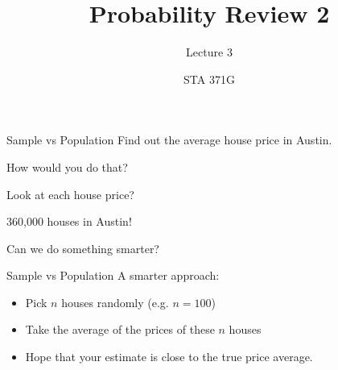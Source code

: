 \documentclass{beamer}\usepackage[]{graphicx}\usepackage[]{color}
\title{Probability Review 2}
\subtitle{Lecture 3}
\author{STA 371G}
\begin{document}
  
  

  \frame{\maketitle}



   \begin{darkframes}
  

	\begin{frame}[label=lists]{Sample vs Population}
    	Find out the average house price in Austin. \pause
    	
    	How would you do that? 
    	
		\begin{figure} 
			\centering
			\setlength\fboxsep{0pt}
			\setlength\fboxrule{0.5pt}
		\end{figure}  \pause
			
		
		Look at each house price?  \pause
		
		360,000 houses in Austin!   \pause
		
		Can we do something smarter? 
		
     
      
    \end{frame}    
    
    
    
    \begin{frame}[label=lists]{Sample vs Population}
    	A smarter approach: \pause
   		\begin{itemize}
   			\item Pick $n$ houses randomly (e.g. $n=100$) \pause
   			\item Take the average of the prices of these $n$ houses \pause
   			\item Hope that your estimate is close to the true price average. \pause
   		\end{itemize}
   		

\end{frame}
\end{darkframes}
\end{document}
